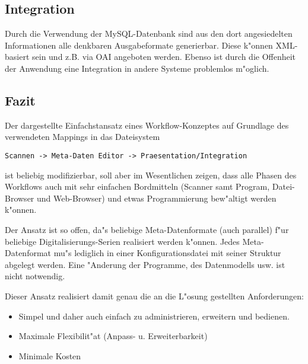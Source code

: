 \documentclass[11pt, twoside, a4paper, BCOR8mm, DIV12, bibtotoc,idxtotoc]{scrreprt}
\begin{document}
\subsection{Integration}

Durch die Verwendung der MySQL-Datenbank sind aus den dort
angesiedelten Informationen alle denkbaren Ausgabeformate
generierbar. Diese k"onnen XML-basiert sein und z.B. via OAI angeboten
werden. Ebenso ist durch die Offenheit der Anwendung eine Integration
in andere Systeme problemlos m"oglich.

\subsection{Fazit}

Der dargestellte Einfachstansatz eines Workflow-Konzeptes auf
Grundlage des verwendeten Mappings in das Dateisystem



\begin{verbatim}
Scannen -> Meta-Daten Editor -> Praesentation/Integration
\end{verbatim}


ist beliebig
modifizierbar, soll aber im Wesentlichen zeigen, dass alle Phasen des
Workflows auch mit sehr einfachen Bordmitteln (Scanner samt Program,
Datei-Browser und Web-Browser) und etwas Programmierung bew"altigt
werden k"onnen.

Der Ansatz ist so offen, da"s beliebige Meta-Datenformate (auch
parallel) f"ur beliebige Digitalisie\-rungs-Serien realisiert werden
k"onnen. Jedes Meta-Datenformat mu"s lediglich in einer
Konfigurationsdatei mit seiner Struktur abgelegt werden. Eine
"Anderung der Programme, des Datenmodells usw. ist nicht notwendig.

Dieser Ansatz realisiert damit genau die an die L"osung gestellten
Anforderungen:

\begin{itemize}
\item Simpel und daher auch einfach zu administrieren, erweitern und
  bedienen.
\item Maximale Flexibilit"at (Anpass- u. Erweiterbarkeit)
\item Minimale Kosten
\end{itemize}
\end{document}
